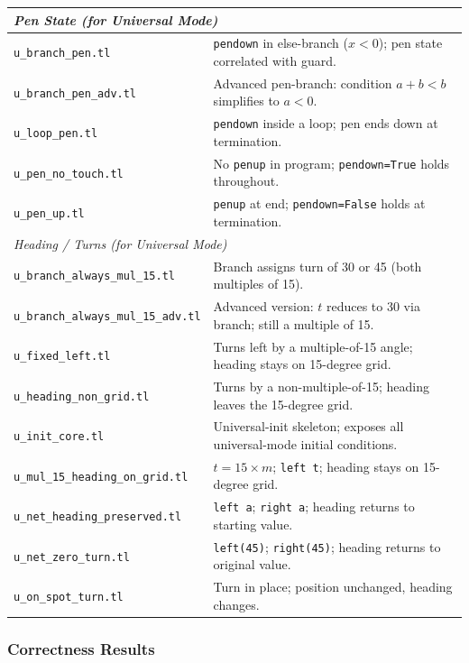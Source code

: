 {\begin{longtable}{p{} p{}}
\midrule
\multicolumn{2}{l}{\textit{Pen State (for Universal Mode)}} \\
\midrule
\texttt{u\_branch\_pen.tl}            & \texttt{pendown} in else-branch ($x{<}0$); pen state correlated with guard. \\
\texttt{u\_branch\_pen\_adv.tl}       & Advanced pen-branch: condition $a{+}b{<}b$ simplifies to $a{<}0$. \\
\texttt{u\_loop\_pen.tl}              & \texttt{pendown} inside a loop; pen ends down at termination. \\
\texttt{u\_pen\_no\_touch.tl}         & No \texttt{penup} in program; \texttt{pendown=True} holds throughout. \\
\texttt{u\_pen\_up.tl}                & \texttt{penup} at end; \texttt{pendown=False} holds at termination. \\

\midrule
\multicolumn{2}{l}{\textit{Heading / Turns (for Universal Mode)}} \\
\midrule
\texttt{u\_branch\_always\_mul\_15.tl}     & Branch assigns turn of 30 or 45 (both multiples of 15). \\
\texttt{u\_branch\_always\_mul\_15\_adv.tl}& Advanced version: $t$ reduces to 30 via branch; still a multiple of 15. \\
\texttt{u\_fixed\_left.tl}                 & Turns left by a multiple-of-15 angle; heading stays on 15-degree grid. \\
\texttt{u\_heading\_non\_grid.tl}          & Turns by a non-multiple-of-15; heading leaves the 15-degree grid. \\
\texttt{u\_init\_core.tl}                  & Universal-init skeleton; exposes all universal-mode initial conditions. \\
\texttt{u\_mul\_15\_heading\_on\_grid.tl}  & $t{=}15{\times}m$; \texttt{left t}; heading stays on 15-degree grid. \\
\texttt{u\_net\_heading\_preserved.tl}     & \texttt{left a}; \texttt{right a}; heading returns to starting value. \\
\texttt{u\_net\_zero\_turn.tl}             & \texttt{left(45)}; \texttt{right(45)}; heading returns to original value. \\
\texttt{u\_on\_spot\_turn.tl}              & Turn in place; position unchanged, heading changes. \\
\end{longtable}
}


\subsubsection*{Correctness Results}

